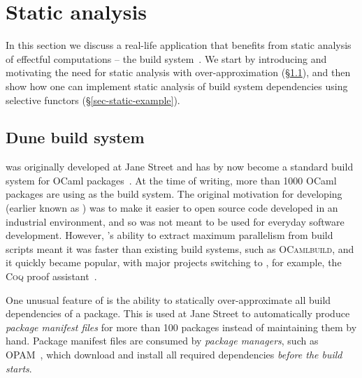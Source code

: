 \section{Static analysis}\label{sec-static}

In this section we discuss a real-life application that benefits from static
analysis of effectful computations -- the \Dune build system~\citep{dune}. We
start by introducing \Dune and motivating the need for static analysis with
over-approximation (\S\ref{sec-dune-intro}), and then show how one can implement
static analysis of build system dependencies using selective functors
(\S\ref{sec-static-example}).

\subsection{Dune build system}\label{sec-dune-intro}

\Dune was originally developed at Jane Street and has by now become a standard
build system for OCaml packages~\citep{dune}. At the time of writing, more than
1000 OCaml packages are using \Dune as the build system. The original motivation
for developing \Dune (earlier known as ) was to make it easier
to open source code developed in an industrial environment, and so \Dune was not
meant to be used for everyday software development. However, \Dune's ability to
extract maximum parallelism from build scripts meant it was faster than existing
build systems, such as \textsc{OCamlbuild}, and it quickly became popular, with
major projects switching to \Dune, for example, the \textsc{Coq} proof
assistant~\citep{bertot2013coq}.


One unusual feature of \Dune is the ability to statically
over-approximate all build dependencies of a package. This is used at
Jane Street to automatically produce \emph{package manifest files} for
more than 100 packages instead of maintaining them by hand. Package
manifest files are consumed by \emph{package managers}, such as
OPAM~\citep{opam}, which download and install all required dependencies
\emph{before the build starts}.


